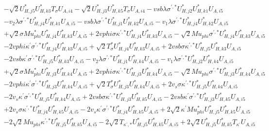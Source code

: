 \begin{align}
 &- \sqrt{2} U^*_{{H},{j 5}} U^*_{{H},{k 3}} T_{\sigma} U_{A,{i 4}} - \sqrt{2} U^*_{{H},{j 3}} U^*_{{H},{k 5}} T_{\sigma} U_{A,{i 4}} - vsb \lambda \sigma^{\prime,*} U^*_{{H},{j 2}} U^*_{{H},{k 1}} U_{A,{i 5}} \nonumber \\ 
 &- v_2 \lambda \sigma^{\prime,*} U^*_{{H},{j 4}} U^*_{{H},{k 1}} U_{A,{i 5}} - vsb \lambda \sigma^{\prime,*} U^*_{{H},{j 1}} U^*_{{H},{k 2}} U_{A,{i 5}} - v_1 \lambda \sigma^{\prime,*} U^*_{{H},{j 4}} U^*_{{H},{k 2}} U_{A,{i 5}} \nonumber \\ 
 &+\sqrt{2} \sigma Mu_{phi}^* U^*_{{H},{j 4}} U^*_{{H},{k 3}} U_{A,{i 5}} +2 vphi \sigma \kappa^{\prime,*} U^*_{{H},{j 4}} U^*_{{H},{k 3}} U_{A,{i 5}} - \sqrt{2} Mu_{phi} \sigma^{\prime,*} U^*_{{H},{j 4}} U^*_{{H},{k 3}} U_{A,{i 5}} \nonumber \\ 
 &-2 vphi \kappa^\prime \sigma^{\prime,*} U^*_{{H},{j 4}} U^*_{{H},{k 3}} U_{A,{i 5}} +\sqrt{2} T_{\sigma}^* U^*_{{H},{j 4}} U^*_{{H},{k 3}} U_{A,{i 5}} +2 vsb \sigma \kappa^{\prime,*} U^*_{{H},{j 5}} U^*_{{H},{k 3}} U_{A,{i 5}} \nonumber \\ 
 &-2 vsb \kappa^\prime \sigma^{\prime,*} U^*_{{H},{j 5}} U^*_{{H},{k 3}} U_{A,{i 5}} - v_2 \lambda \sigma^{\prime,*} U^*_{{H},{j 1}} U^*_{{H},{k 4}} U_{A,{i 5}} - v_1 \lambda \sigma^{\prime,*} U^*_{{H},{j 2}} U^*_{{H},{k 4}} U_{A,{i 5}} \nonumber \\ 
 &+\sqrt{2} \sigma Mu_{phi}^* U^*_{{H},{j 3}} U^*_{{H},{k 4}} U_{A,{i 5}} +2 vphi \sigma \kappa^{\prime,*} U^*_{{H},{j 3}} U^*_{{H},{k 4}} U_{A,{i 5}} - \sqrt{2} Mu_{phi} \sigma^{\prime,*} U^*_{{H},{j 3}} U^*_{{H},{k 4}} U_{A,{i 5}} \nonumber \\ 
 &-2 vphi \kappa^\prime \sigma^{\prime,*} U^*_{{H},{j 3}} U^*_{{H},{k 4}} U_{A,{i 5}} +\sqrt{2} T_{\sigma}^* U^*_{{H},{j 3}} U^*_{{H},{k 4}} U_{A,{i 5}} +2 v_s \sigma \kappa^{\prime,*} U^*_{{H},{j 5}} U^*_{{H},{k 4}} U_{A,{i 5}} \nonumber \\ 
 &-2 v_s \kappa^\prime \sigma^{\prime,*} U^*_{{H},{j 5}} U^*_{{H},{k 4}} U_{A,{i 5}} +2 vsb \sigma \kappa^{\prime,*} U^*_{{H},{j 3}} U^*_{{H},{k 5}} U_{A,{i 5}} -2 vsb \kappa^\prime \sigma^{\prime,*} U^*_{{H},{j 3}} U^*_{{H},{k 5}} U_{A,{i 5}} \nonumber \\ 
 &+2 v_s \sigma \kappa^{\prime,*} U^*_{{H},{j 4}} U^*_{{H},{k 5}} U_{A,{i 5}} -2 v_s \kappa^\prime \sigma^{\prime,*} U^*_{{H},{j 4}} U^*_{{H},{k 5}} U_{A,{i 5}} +2 \sqrt{2} \kappa^\prime Mu_{phi}^* U^*_{{H},{j 5}} U^*_{{H},{k 5}} U_{A,{i 5}} \nonumber \\ 
 &-2 \sqrt{2} Mu_{phi} \kappa^{\prime,*} U^*_{{H},{j 5}} U^*_{{H},{k 5}} U_{A,{i 5}} -2 \sqrt{2} T_{\kappa^{\prime},*} U^*_{{H},{j 5}} U^*_{{H},{k 5}} U_{A,{i 5}} +2 \sqrt{2} U^*_{{H},{j 5}} U^*_{{H},{k 5}} T_{\kappa^\prime} U_{A,{i 5}} \nonumber \\ 

\end{align}
